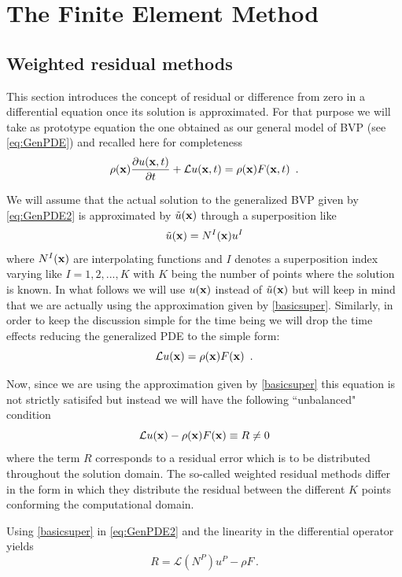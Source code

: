 \graphicspath{ {./img/TheFEM/} }
\chapter{The Finite Element Method}
\section{Weighted residual methods}
This section introduces the concept of residual or difference from zero in a differential equation once its solution is approximated. For that purpose we will take as prototype equation the one obtained as our general model of BVP (see \cref{eq:GenPDE}) and recalled here for completeness
\begin{equation}
\rho(\vb x) \pdv{u(\vb x, t)}{t} + \mathcal{L}u(\vb x, t) = \rho (\vb x)F(\vb x, t) \enspace .
\label{eq:GenPDE2}
\end{equation}

We will assume that the actual solution to the generalized BVP given by \cref{eq:GenPDE2} is approximated by $\tilde u(\vb{x})$ through a superposition like
\begin{equation}
\tilde u (\vb{x}) = {N^I}(\vb{x}){u^I}
\label{basicsuper}
\end{equation}
where ${N^I}(\vb{x})$ are interpolating functions and $I$ denotes a superposition index  varying like $I=1,2,...,K$ with $K$ being the number of points where the solution is known. In what follows we will use $u(\vb{x})$ instead of $\tilde u (\vb{x})$ but will keep in mind that we are actually using the approximation given by \cref{basicsuper}. Similarly, in order to keep the discussion simple for the time being we will drop the time effects reducing the generalized PDE to the simple form:
\begin{equation}
\mathcal{L}u(\vb x) = \rho (\vb x)F(\vb x) \enspace .
\label{eq:GenPDE3}
\end{equation}

Now, since we are using the approximation given by \cref{basicsuper} this equation is not strictly satisifed but instead we will have the following ``unbalanced" condition
\[\mathcal{L}u(\vb{x}) - \rho (\vb{x})F(\vb{x}) \equiv R \ne 0\]
where the term $R$ corresponds to a residual error which is to be distributed throughout the solution domain. The so-called weighted residual methods differ in the form in which they distribute the residual between the different $K$ points conforming the computational domain.

Using \cref{basicsuper} in \cref{eq:GenPDE2} and the linearity in the differential operator yields
\[R = \mathcal{L}({N^P}){u^P} - \rho F\, .\]

